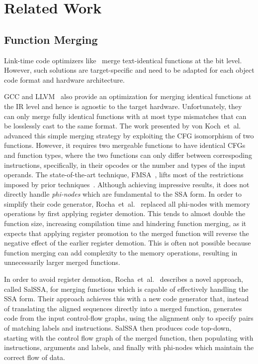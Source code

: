
\section{Related Work}

\subsection{Function Merging}

Link-time code optimizers like~\cite{tallam10,kwan12,msvc-icf} merge text-identical functions at the bit level.
However, such solutions are target-specific and need to be adapted for each object code format and hardware architecture.

GCC and LLVM~\cite{llvm-fm,livska14} also provide an optimization for merging identical functions at the IR level and hence is agnostic to the target hardware.
Unfortunately, they can only merge fully identical functions with at most type mismatches that can be losslessly cast to the same format.
The work presented by von Koch~et~al.~\cite{edler14} advanced this simple merging strategy by exploiting the CFG isomorphism of two
functions. However, it requires two mergeable functions to have identical CFGs and function types, where the two functions can only differ
between correspoding instructions, specifically, in their opcodes or the number and types of the input operands.
The state-of-the-art technique, FMSA~\cite{rocha19}, lifts most of the restrictions imposed by prior techniques~\cite{llvm-fm,livska14,edler14}.
Although achieving impressive results, it does not directly handle \textit{phi-nodes} which are fundamental to the SSA form.
In order to simplify their code generator, Rocha~et~al.~\cite{rocha19} replaced all phi-nodes with memory operations by first applying register demotion.
This tends to almost double the function size, increasing compilation time and hindering function merging, as it expects that applying register promotion to the merged function will reverse the negative effect of the earlier register demotion.
This is often not possible because function merging can add complexity to the memory operations, resulting in unnecessarily larger merged functions.

In order to avoid register demotion, Rocha~et~al.~\cite{rocha20} describes a novel approach, called SalSSA, for merging functions which is capable of effectively handling the SSA form.
Their approach achieves this with a new code generator that, instead of translating the aligned sequences directly into a merged function, generates code from the input control-flow graphs, using the alignment only to specify pairs of matching labels and instructions.
SalSSA then produces code top-down, starting with the control flow graph of the merged function, then populating with instructions, arguments and labels, and finally with phi-nodes which maintain the correct flow of data.

